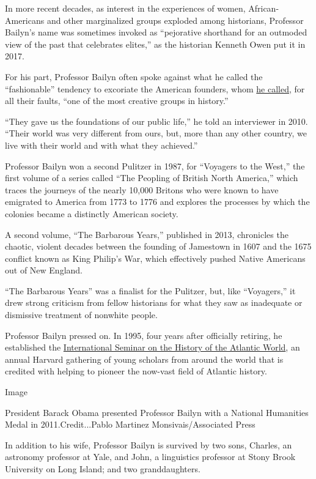 In more recent decades, as interest in the experiences of women,
African-Americans and other marginalized groups exploded among
historians, Professor Bailyn's name was sometimes invoked as
``pejorative shorthand for an outmoded view of the past that celebrates
elites,'' as the historian Kenneth Owen put it in 2017.

For his part, Professor Bailyn often spoke against what he called the
``fashionable'' tendency to excoriate the American founders, whom
\href{https://www.neh.gov/news/press-release/1998-03-23}{he called}, for
all their faults, ``one of the most creative groups in history.''

``They gave us the foundations of our public life,'' he told an
interviewer in 2010. ``Their world was very different from ours, but,
more than any other country, we live with their world and with what they
achieved.''

Professor Bailyn won a second Pulitzer in 1987, for ``Voyagers to the
West,'' the first volume of a series called ``The Peopling of British
North America,'' which traces the journeys of the nearly 10,000 Britons
who were known to have emigrated to America from 1773 to 1776 and
explores the processes by which the colonies became a distinctly
American society.

A second volume, ``The Barbarous Years,'' published in 2013, chronicles
the chaotic, violent decades between the founding of Jamestown in 1607
and the 1675 conflict known as King Philip's War, which effectively
pushed Native Americans out of New England.

``The Barbarous Years'' was a finalist for the Pulitzer, but, like
``Voyagers,'' it drew strong criticism from fellow historians for what
they saw as inadequate or dismissive treatment of nonwhite people.

Professor Bailyn pressed on. In 1995, four years after officially
retiring, he established the
\href{https://sites.fas.harvard.edu/~atlantic/index.htm}{International
Seminar on the History of the Atlantic World}, an annual Harvard
gathering of young scholars from around the world that is credited with
helping to pioneer the now-vast field of Atlantic history.

Image

President Barack Obama presented Professor Bailyn with a National
Humanities Medal in 2011.Credit...Pablo Martinez Monsivais/Associated
Press

In addition to his wife, Professor Bailyn is survived by two sons,
Charles, an astronomy professor at Yale, and John, a linguistics
professor at Stony Brook University on Long Island; and two
granddaughters.


